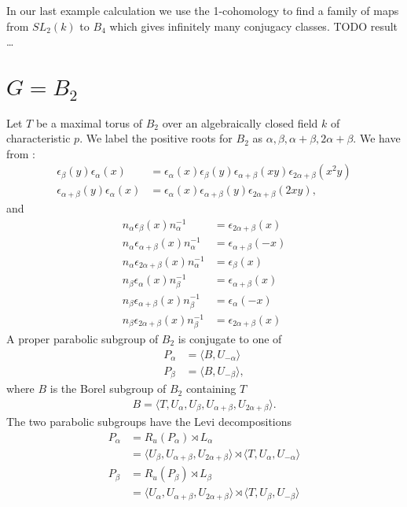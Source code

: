 	In our last example calculation we use the 1-cohomology to find a family of maps from $SL_2(k)$ to $B_4$ which gives infinitely many conjugacy classes. TODO result \ldots


\section{$G = B_2$}
\label{b2}

Let $T$ be a maximal torus of $B_2$ over an algebraically closed field $k$ of characteristic $p$. We label the positive roots for $B_2$ as $\alpha, \beta, \alpha + \beta, 2\alpha + \beta$. We have from \cite[\S 33.4]{humphreys1975linear}:
\begin{align*}
\epsilon_\beta (y) \epsilon_\alpha (x) &= \epsilon_\alpha (x) \epsilon_\beta (y) \epsilon_{\alpha + \beta} (xy) \epsilon_{2\alpha+\beta} (x^2y) \\
\epsilon_{\alpha + \beta} (y) \epsilon_\alpha (x) &= \epsilon_\alpha (x) \epsilon_{\alpha + \beta} (y) \epsilon_{2\alpha + \beta} (2xy),
\end{align*}
and 
\begin{align*}
n_\alpha \epsilon_\beta(x) n_\alpha^{-1} &= \epsilon_{2\alpha+\beta}(x)\\
n_\alpha \epsilon_{\alpha+\beta}(x) n_\alpha^{-1} &= \epsilon_{\alpha+\beta}(-x)\\
n_\alpha \epsilon_{2\alpha+\beta}(x) n_\alpha^{-1} &= \epsilon_{\beta}(x)\\
n_\beta \epsilon_\alpha(x) n_\beta^{-1} &= \epsilon_{\alpha+\beta}(x)\\
n_\beta \epsilon_{\alpha+\beta}(x) n_\beta^{-1} &= \epsilon_{\alpha}(-x)\\
n_\beta \epsilon_{2\alpha+\beta}(x) n_\beta^{-1} &= \epsilon_{2\alpha+\beta}(x)
\end{align*}
A proper parabolic subgroup of $B_2$ is conjugate to one of
\begin{align*}
P_\alpha &= \langle B, U_{-\alpha} \rangle\\
P_\beta &= \langle B, U_{-\beta} \rangle,
\end{align*}
where $B$ is the Borel subgroup of $B_2$ containing $T$
\begin{align*}
B=\langle T, U_\alpha, U_\beta, U_{\alpha + \beta}, U_{2\alpha+\beta}\rangle.
\end{align*}
The two parabolic subgroups have the Levi decompositions
\begin{align*}
P_\alpha &= R_u(P_\alpha) \rtimes L_\alpha \\
&= \langle U_\beta, U_{\alpha + \beta}, U_{2\alpha + \beta} \rangle \rtimes \langle T, U_\alpha, U_{-\alpha} \rangle \\ 
P_\beta &= R_u(P_\beta) \rtimes L_\beta \\
&= \langle U_\alpha, U_{\alpha+\beta}, U_{2\alpha + \beta} \rangle \rtimes \langle T, U_\beta, U_{-\beta} \rangle \\
\end{align*}

